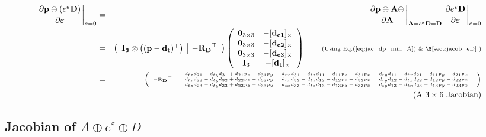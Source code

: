 \documentclass[a4paper,11pt]{report}
\newcommand{\E}{{\bm{\varepsilon}}}
\begin{document}
\begin{eqnarray}
\label{eq:jacob_p_min_eD_e}
\left. \frac{\partial \mathbf{p} \ominus (e^\E \mathbf{D}) }{\partial \E} \right|_{\E = 0}
&=& 
\left. \frac{\partial \mathbf{p} \ominus \mathbf{A} \oplus }{\partial \mathbf{A} } \right|_{\mathbf{A}=e^\E \mathbf{D} = \mathbf{D}}
\left. \frac{\partial e^\E \mathbf{D}}{\partial \E} \right|_{\E=0}
\nonumber \\
&=&
\left(
\begin{array}{c|c}
 \mathbf{I_3} \otimes \left( (\mathbf{p}-\mathbf{d_t})^\top \right)
 &
 -\mathbf{R_D}^\top
\end{array}
\right)
\left(
\begin{array}{cc}
 \mathbf{0}_{3\times 3}  & -[\mathbf{d_{c1}}]_\times \\
 \mathbf{0}_{3\times 3}  & -[\mathbf{d_{c2}}]_\times \\
 \mathbf{0}_{3\times 3}  & -[\mathbf{d_{c3}}]_\times \\
 \mathbf{I}_{3}  & -[\mathbf{d_{t}}]_\times \\
\end{array}
\right) 
\quad\quad \text{\scriptsize{(Using Eq.(\ref{eq:jac_dp_min_A})  \& \S\ref{sect:jacob_eD}} )}
\\
&=& 
\tiny{\left(
\begin{array}{cc}
   -\mathbf{R_D}^\top &
  \begin{array}{ccc}
  d_{tz} d_{21} - d_{ty} d_{31} + d_{21} p_z - d_{31} p_y & d_{tx} d_{31} - d_{tz} d_{11} - d_{11} p_z + d_{31} p_x & d_{ty} d_{11} - d_{tx} d_{21} + d_{11} p_y - d_{21} p_x \\
  d_{tz} d_{22} - d_{ty} d_{32} + d_{22} p_z - d_{32} p_y & d_{tx} d_{32} - d_{tz} d_{12} - d_{12} p_z + d_{32} p_x & d_{ty} d_{12} - d_{tx} d_{22} + d_{12} p_y - d_{22} p_x \\
  d_{tz} d_{23} - d_{ty} d_{33} + d_{23} p_z - d_{33} p_y & d_{tx} d_{33} - d_{tz} d_{13} - d_{13} p_z + d_{33} p_x & d_{ty} d_{13} - d_{tx} d_{23} + d_{13} p_y - d_{23} p_x \\
  \end{array}
\end{array}
\right)} \nonumber \\
 && \quad\quad \quad\quad\quad \text{(A $3 \times 6$ Jacobian)} \nonumber
\end{eqnarray}



\subsection{Jacobian of $A \oplus e^\varepsilon \oplus D$}
\end{document}
